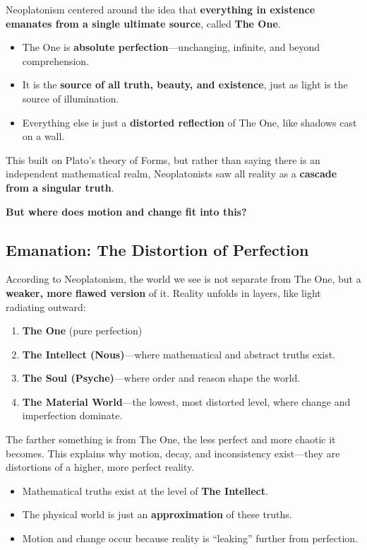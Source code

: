 Neoplatonism centered around the idea that \textbf{everything in existence emanates from a single ultimate source}, called \textbf{The One}.

\begin{itemize}
    \item The One is \textbf{absolute perfection}—unchanging, infinite, and beyond comprehension.
    \item It is the \textbf{source of all truth, beauty, and existence}, just as light is the source of illumination.
    \item Everything else is just a \textbf{distorted reflection} of The One, like shadows cast on a wall.
\end{itemize}

This built on Plato’s theory of Forms, but rather than saying there is an independent mathematical realm, Neoplatonists saw all reality as a \textbf{cascade from a singular truth}.

\textbf{But where does motion and change fit into this?}

\subsection{Emanation: The Distortion of Perfection}

According to Neoplatonism, the world we see is not separate from The One, but a \textbf{weaker, more flawed version} of it. Reality unfolds in layers, like light radiating outward:

\begin{enumerate}
    \item \textbf{The One} (pure perfection)
    \item \textbf{The Intellect (Nous)}—where mathematical and abstract truths exist.
    \item \textbf{The Soul (Psyche)}—where order and reason shape the world.
    \item \textbf{The Material World}—the lowest, most distorted level, where change and imperfection dominate.
\end{enumerate}

The farther something is from The One, the less perfect and more chaotic it becomes. This explains why motion, decay, and inconsistency exist—they are distortions of a higher, more perfect reality.

\begin{itemize}
    \item Mathematical truths exist at the level of \textbf{The Intellect}.
    \item The physical world is just an \textbf{approximation} of these truths.
    \item Motion and change occur because reality is “leaking” further from perfection.
\end{itemize}

